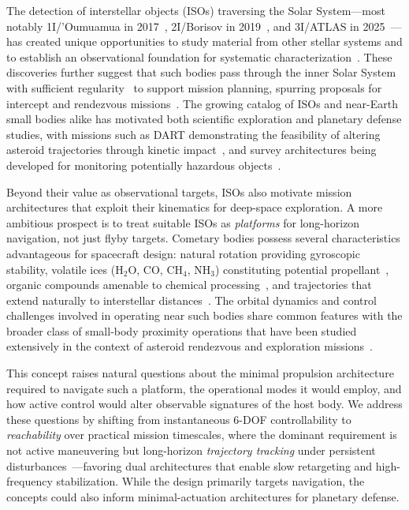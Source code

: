 \documentclass{article}
\begin{document}
The detection of interstellar objects (ISOs) traversing the Solar System---most notably 1I/\hspace{0pt}'Oumuamua in 2017~\cite{meech2017oumuamua}, 2I/Borisov in 2019~\cite{jewitt2019comet}, and 3I/ATLAS in 2025~\cite{loeb2025intercepting}---has created unique opportunities to study material from other stellar systems and to establish an observational foundation for systematic characterization~\cite{eldadi2026ioss}. These discoveries further suggest that such bodies pass through the inner Solar System with sufficient regularity~\cite{delaFuenteMarcos2024ejected} to support mission planning, spurring proposals for intercept and rendezvous missions~\cite{hein2022interstellar,seligman2018oumuamua,hibberd2020project}. The growing catalog of ISOs and near-Earth small bodies alike has motivated both scientific exploration and planetary defense studies, with missions such as DART demonstrating the feasibility of altering asteroid trajectories through kinetic impact~\cite{rivkin2021dart}, and survey architectures being developed for monitoring potentially hazardous objects~\cite{zhou2022crown}.

Beyond their value as observational targets, ISOs also motivate mission architectures that exploit their kinematics for deep-space exploration. A more ambitious prospect is to treat suitable ISOs as \textit{platforms} for long-horizon navigation, not just flyby targets. Cometary bodies possess several characteristics advantageous for spacecraft design: natural rotation providing gyroscopic stability, volatile ices (H$_2$O, CO, CH$_4$, NH$_3$) constituting potential propellant~\cite{mumma2011composition,altwegg2019rosina}, organic compounds amenable to chemical processing~\cite{biver2019rosetta}, and trajectories that extend naturally to interstellar distances~\cite{jewitt2022interstellar}. The orbital dynamics and control challenges involved in operating near such bodies share common features with the broader class of small-body proximity operations that have been studied extensively in the context of asteroid rendezvous and exploration missions~\cite{lee2014hovering,qiao2023gravitational}.

This concept raises natural questions about the minimal propulsion architecture required to navigate such a platform, the operational modes it would employ, and how active control would alter observable signatures of the host body. We address these questions by shifting from instantaneous 6-DOF controllability to \emph{reachability} over practical mission timescales, where the dominant requirement is not active maneuvering but long-horizon \emph{trajectory tracking} under persistent disturbances~\cite{andree2026stability}---favoring dual architectures that enable slow retargeting and high-frequency stabilization. While the design primarily targets navigation, the concepts could also inform minimal-actuation architectures for planetary defense.
\end{document}
